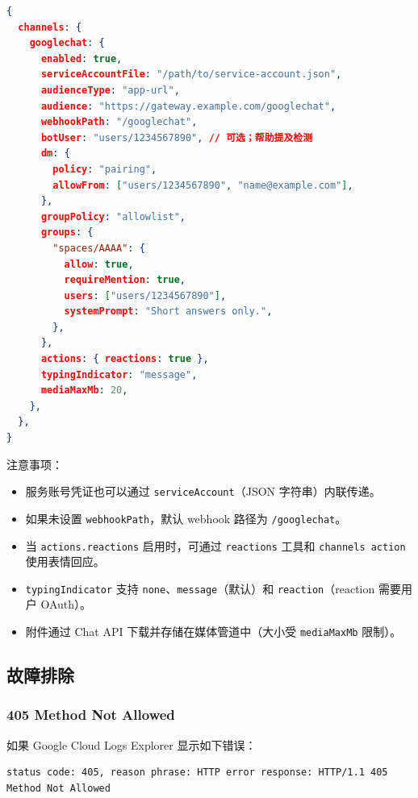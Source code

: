 \begin{lstlisting}[language=json]
{
  channels: {
    googlechat: {
      enabled: true,
      serviceAccountFile: "/path/to/service-account.json",
      audienceType: "app-url",
      audience: "https://gateway.example.com/googlechat",
      webhookPath: "/googlechat",
      botUser: "users/1234567890", // 可选；帮助提及检测
      dm: {
        policy: "pairing",
        allowFrom: ["users/1234567890", "name@example.com"],
      },
      groupPolicy: "allowlist",
      groups: {
        "spaces/AAAA": {
          allow: true,
          requireMention: true,
          users: ["users/1234567890"],
          systemPrompt: "Short answers only.",
        },
      },
      actions: { reactions: true },
      typingIndicator: "message",
      mediaMaxMb: 20,
    },
  },
}
\end{lstlisting}


注意事项：

\begin{itemize}
  \item 服务账号凭证也可以通过 \texttt{serviceAccount}（JSON 字符串）内联传递。
  \item 如果未设置 \texttt{webhookPath}，默认 webhook 路径为 \texttt{/googlechat}。
  \item 当 \texttt{actions.reactions} 启用时，可通过 \texttt{reactions} 工具和 \texttt{channels action} 使用表情回应。
  \item \texttt{typingIndicator} 支持 \texttt{none}、\texttt{message}（默认）和 \texttt{reaction}（reaction 需要用户 OAuth）。
  \item 附件通过 Chat API 下载并存储在媒体管道中（大小受 \texttt{mediaMaxMb} 限制）。
\end{itemize}


\subsection{故障排除}


\subsubsection{405 Method Not Allowed}


如果 Google Cloud Logs Explorer 显示如下错误：

\begin{lstlisting}
status code: 405, reason phrase: HTTP error response: HTTP/1.1 405 Method Not Allowed
\end{lstlisting}


